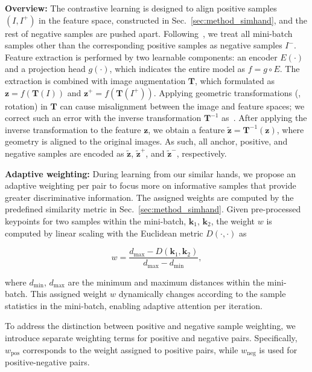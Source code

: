 \textbf{Overview:}
The contrastive learning is designed to align positive samples $(I,I^+)$ in the feature space, constructed in Sec.~\ref{sec:method_simhand}, and the rest of negative samples are pushed apart.
Following~\citep{chen:icml20, spurr:iccv21}, we treat all mini-batch samples other than the corresponding positive samples as negative samples $I^-$.
Feature extraction is performed by two learnable components: an encoder \( E(\cdot) \) and a projection head \( g(\cdot) \), which indicates the entire model as \( f = g \circ E \).
The extraction is combined with image augmentation \( \mathbf {T} \), which formulated as \( \mathbf{z} = f(\mathbf{T}(I)) \) and  \( \mathbf{z}^+ = f(\mathbf{T}(I^+)) \).
Applying geometric transformations (\eg, rotation) in \( \mathbf {T} \) can cause misalignment between the image and feature spaces; we correct such an error with the inverse transformation \( \mathbf {T}^{-1} \) as~\citep{spurr:iccv21}.
After applying the inverse transformation to the feature \( \mathbf{z} \), we obtain a feature \( \tilde{\mathbf{z}} = \mathbf{T}^{-1}(\mathbf{z}) \), where geometry is aligned to the original images.
As such, all anchor, positive, and negative samples are encoded as $\tilde{\mathbf{z}}$, $\tilde{\mathbf{z}}^+$, and $\tilde{\mathbf{z}}^-$, respectively.

\textbf{Adaptive weighting:} During learning from our similar hands, we propose an adaptive weighting per pair to focus more on informative samples that provide greater discriminative information. 
The assigned weights are computed by the predefined similarity metric in Sec.~\ref{sec:method_simhand}. Given pre-processed keypoints for two samples within the mini-batch, $\mathbf{k}_1$, $\mathbf{k}_2$, the weight $w$ is computed by linear scaling with the Euclidean metric $D(\cdot,\cdot)$ as

{
\begin{equation}
w= \frac{d_{\text{max}} - D(\mathbf{k}_1, \mathbf{k}_2)}{d_{\text{max}} - d_{\text{min}}},
\end{equation}
}

where $d_{\text{min}}$, $d_{\text{max}}$ are the minimum and maximum distances within the mini-batch.
This assigned weight $w$ dynamically changes according to the sample statistics in the mini-batch, enabling adaptive attention per iteration.

To address the distinction between positive and negative sample weighting, we introduce separate weighting terms for positive and negative pairs. Specifically, \( w_{\text{pos}} \) corresponds to the weight assigned to positive pairs, while \( w_{\text{neg}} \) is used for positive-negative pairs.

